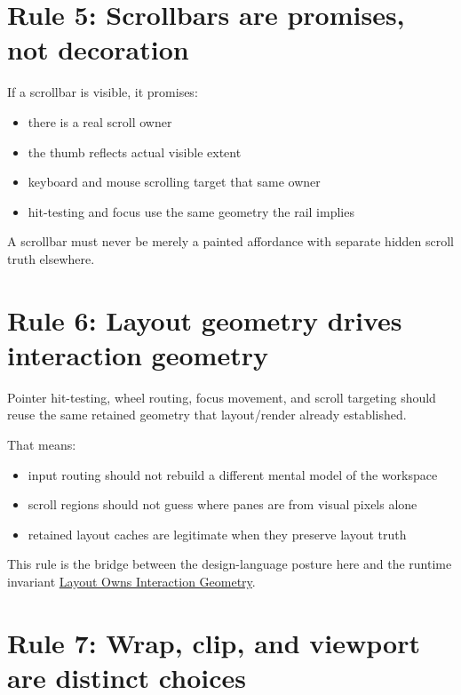 \section{Rule 5: Scrollbars are promises, not decoration}\label{record-048-rule-5-scrollbars-are-promises-not-decoration}

If a scrollbar is visible, it promises:

\begin{itemize}
\tightlist
\item
  there is a real scroll owner
\item
  the thumb reflects actual visible extent
\item
  keyboard and mouse scrolling target that same owner
\item
  hit-testing and focus use the same geometry the rail implies
\end{itemize}

A scrollbar must never be merely a painted affordance with separate hidden scroll truth elsewhere.

\section{Rule 6: Layout geometry drives interaction geometry}\label{record-048-rule-6-layout-geometry-drives-interaction-geometry}

Pointer hit-testing, wheel routing, focus movement, and scroll targeting should reuse the same retained geometry that layout/render already established.

That means:

\begin{itemize}
\tightlist
\item
  input routing should not rebuild a different mental model of the workspace
\item
  scroll regions should not guess where panes are from visual pixels alone
\item
  retained layout caches are legitimate when they preserve layout truth
\end{itemize}

This rule is the bridge between the design-language posture here and the runtime invariant \href{https://github.com/flyingrobots/bijou/blob/cbd70612140e7a450d764b3c7be1c6af878b99bc/docs/invariants/layout-owns-interaction-geometry.md}{Layout Owns Interaction Geometry}.

\section{Rule 7: Wrap, clip, and viewport are distinct choices}\label{record-048-rule-7-wrap-clip-and-viewport-are-distinct-choices}

